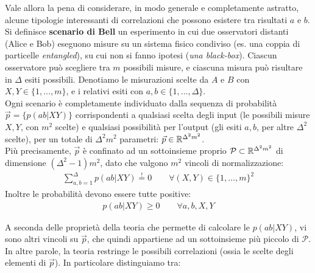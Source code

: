 \documentclass[../../InformazioneQuantistica.tex]{subfiles}
\begin{document}
Vale allora la pena di considerare, in modo generale e completamente astratto, alcune tipologie interessanti di correlazioni che possono esistere tra risultati $a$ e $b$.\\
Si definisce \textbf{scenario di Bell} un esperimento in cui due osservatori distanti (Alice e Bob) eseguono misure su un sistema fisico condiviso (es. una coppia di particelle \textit{entangled}), su cui non si fanno ipotesi (\textit{una black-box}). Ciascun osservatore può scegliere tra $m$ possibili misure, e ciascuna misura può risultare in $\Delta$ esiti possibili. Denotiamo le misurazioni scelte da $A$ e $B$ con $X,Y \in \{1,\dots,m\}$, e i relativi esiti con $a, b \in \{1,\dots,\Delta\}$.\\

Ogni scenario è completamente individuato dalla sequenza di probabilità $\vec{p}=\{p(ab|XY)\}$ corrispondenti a qualsiasi scelta degli input (le possibili misure $X,Y$, con $m^2$ scelte) e qualsiasi possibilità per l'output (gli esiti $a,b$, per altre $\Delta^2$ scelte), per un totale di $\Delta^2m^2$ parametri: $\vec{p} \in \mathbb{R}^{\Delta^2 m^2}$.\\
Più precisamente, $\vec{p}$ è confinato ad un sottoinsieme proprio $\mathcal{P} \subset \mathbb{R}^{\Delta^2 m^2}$ di dimensione $(\Delta^2-1)m^2$, dato che valgono $m^2$ vincoli di normalizzazione:
\begin{align*}
\sum_{a,b=1}^\Delta p(ab|XY) \overset{!}{=} 0 \qquad \forall (X,Y) \in \{1,\dots,m\}^2 
\end{align*}
Inoltre le probabilità devono essere tutte positive:
\begin{align*}
p(ab|XY) \geq 0 \qquad \forall a,b,X,Y
\end{align*}

A seconda delle proprietà della teoria che permette di calcolare le $p(ab|XY)$, vi sono altri vincoli su $\vec{p}$, che quindi appartiene ad un sottoinsieme più piccolo di $\mathcal{P}$. In altre parole, la teoria restringe le possibili correlazioni (ossia le scelte degli elementi di $\vec{p}$). In particolare distinguiamo tra:
\end{document}
